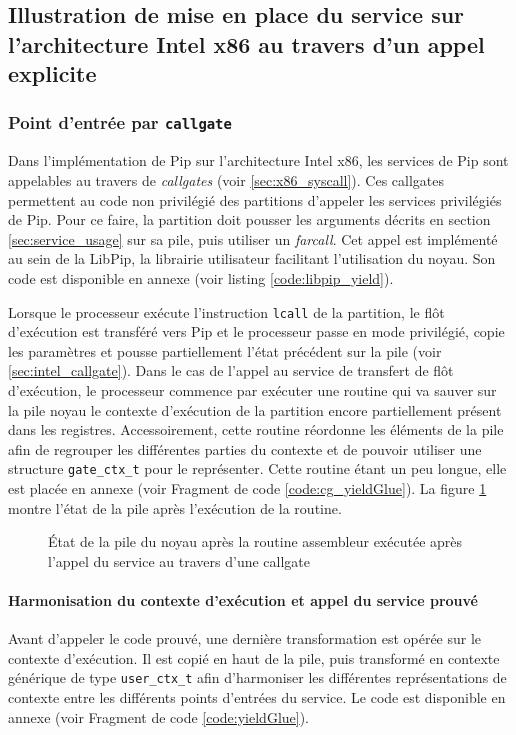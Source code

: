 		\subsection{Illustration de mise en place du service sur l'architecture Intel x86 au travers d'un appel explicite}

			\subsubsection{Point d'entrée par \texttt{callgate}}

		Dans l'implémentation de Pip sur l'architecture Intel x86, les services de Pip sont appelables au travers de \emph{callgates} (voir \ref{sec:x86_syscall}). Ces callgates permettent au code non privilégié des partitions d'appeler les services privilégiés de Pip.
		Pour ce faire, la partition doit pousser les arguments décrits en section \ref{sec:service_usage} sur sa pile, puis utiliser un \emph{farcall}. Cet appel est implémenté au sein de la LibPip, la librairie utilisateur facilitant l'utilisation du noyau. Son code est disponible en annexe (voir listing \ref{code:libpip_yield}).

		Lorsque le processeur exécute l'instruction \texttt{lcall} de la partition, le flôt d'exécution est transféré vers Pip et le processeur passe en mode privilégié, copie les paramètres et pousse partiellement l'état précédent sur la pile (voir \ref{sec:intel_callgate}). Dans le cas de l'appel au service de transfert de flôt d'exécution, le processeur commence par exécuter une routine qui va sauver sur la pile noyau le contexte d'exécution de la partition encore partiellement présent dans les registres. Accessoirement, cette routine réordonne les éléments de la pile afin de regrouper les différentes parties du contexte et de pouvoir utiliser une structure \texttt{gate\_ctx\_t} pour le représenter. Cette routine étant un peu longue, elle est placée en annexe (voir Fragment de code \ref{code:cg_yieldGlue}).
		La figure \ref{fig:cg_stack} montre l'état de la pile après l'exécution de la routine.

		\begin{figure}[!ht]
			
			\caption{État de la pile du noyau après la routine assembleur exécutée après l'appel du service au travers d'une callgate}
			\label{fig:cg_stack}
		\end{figure}
	
		\paragraph{Harmonisation du contexte d'exécution et appel du service prouvé} \label{sec:context_harmonisation} Avant d'appeler le code prouvé, une dernière transformation est opérée sur le contexte d'exécution. Il est copié en haut de la pile, puis transformé en contexte générique de type \texttt{user\_ctx\_t} afin d'harmoniser les différentes représentations de contexte entre les différents points d'entrées du service. Le code est disponible en annexe (voir Fragment de code \ref{code:yieldGlue}).

